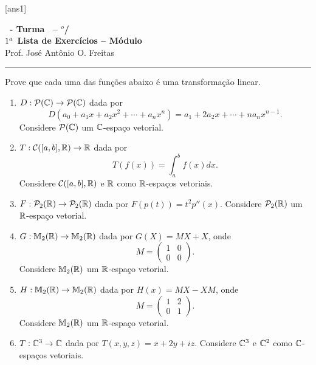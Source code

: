 \documentclass[12pt]{exam}
\begin{document}
  [ans1]
  \begin{center}
    {\Large\bf \disciplina\ - Turma \turma\ -- \semestre$^{o}$/\ano} \\ \vspace{9pt} {\large\bf
        $1^a$ Lista de Exercícios -- Módulo \numeromodulo}\\ \vspace{9pt} Prof. José Antônio O. Freitas
  \end{center}
  \hrule


\begin{exercicio}
  Prove que cada uma das funções abaixo é uma transformação linear.
  \begin{enumerate}[label={\alph*})]
    \item $D : \mathcal{P}(\mathbb{C}) \to \mathcal{P}(\mathbb{C})$ dada por
    \[
        D(a_0 + a_1x + a_2x^2 + \cdots + a_nx^n) = a_1 + 2a_2x + \cdots + na_nx^{n - 1}.
    \]
    Considere $\mathcal{P}(\mathbb{C})$ um $\mathbb{C}$-espaço vetorial.

    \item $T : \mathcal{C}([a,b], \mathbb{R}) \to \mathbb{R}$ dada por
    \[
        T(f(x)) = \int_a^bf(x)dx.
    \]
    Considere $\mathcal{C}([a,b], \mathbb{R})$ e $\mathbb{R}$ como $\mathbb{R}$-espaços vetoriais.

    \item $F : \mathcal{P}_2(\mathbb{R}) \to \mathcal{P}_2(\mathbb{R})$ dada por $F(p(t)) = t^2p''(x)$. Considere $\mathcal{P}_2(\mathbb{R})$ um $\mathbb{R}$-espaço vetorial.

    \item $G : \mathbb{M}_2(\mathbb{R}) \to \mathbb{M}_2(\mathbb{R})$ dada por $G(X) = MX + X$, onde
    \[
        M = \begin{pmatrix}
                1 & 0\\
                0 & 0
            \end{pmatrix}.
    \]
    Considere $\mathbb{M}_2(\mathbb{R})$ um $\mathbb{R}$-espaço vetorial.

    \item $H : \mathbb{M}_2(\mathbb{R}) \to \mathbb{M}_2(\mathbb{R})$ dada por $H(x) = MX - XM$, onde
    \[
        M = \begin{pmatrix}
                1 & 2\\
                0 & 1
            \end{pmatrix}.
    \]
    Considere $\mathbb{M}_2(\mathbb{R})$ um $\mathbb{R}$-espaço vetorial.

    \item $T : \mathbb{C}^3 \to \mathbb{C}$ dada por $T(x,y,z) = x + 2y + iz$. Considere $\mathbb{C}^3$ e $\mathbb{C}^2$ como $\mathbb{C}$-espaços vetoriais.


\end{enumerate}
\end{exercicio}
\end{document}

